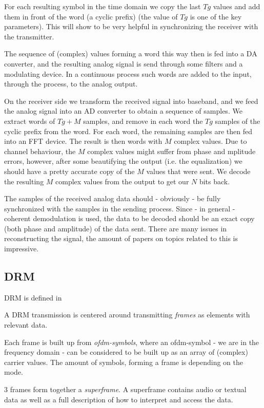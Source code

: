 \documentclass[11pt]{article}
\begin{document}
For each resulting symbol in the time domain we copy the
last $Tg$ values and add them
in front of the word (a cyclic prefix) (the value of $Tg$ is one of the
key parameters). This will show to be very helpful
in synchronizing the receiver with the transmitter.

The sequence of (complex) values forming a word this way then is fed into
a DA converter, and the resulting analog signal is
send through some filters and a modulating device.
In a continuous process such words are added
to the input, through the process, to the analog output.

On the receiver side  we transform the received signal into baseband,
and we feed the analog signal into an AD converter to obtain
a sequence of samples.
We extract words of $Tg + M$ samples, and remove in each word
the $Tg$ samples of the
cyclic prefix from the word.
For each word, the remaining samples are then fed into an FFT device.
The result is then words with $M$ complex values.
Due to channel behaviour, the $M$ complex values might suffer from
phase and mplitude errors, however,
after some beautifying
the output (i.e. the equalization) we should have a pretty accurate copy
of the $M$ values that were sent.
We decode
the resulting $M$ complex values from the output to get our $N$ bits back.

The samples of the received analog data should - obviously -
be fully synchronized with the samples in the sending process.
Since - in general - coherent demodulation is used, the data to be
decoded should be an exact copy (both phase and amplitude) of the
data sent. There are many issues in reconstructing the signal, the amount
of papers on topics related to this is impressive.
\subsection{DRM}
DRM is defined in \cite{drm-definition}

A DRM transmission is centered around transmitting
{\em frames} as elements with relevant data.

Each frame is built up from {\em ofdm-symbols},
where an ofdm-symbol - we are in the
frequency domain - can be considered to be built up as an array
 of (complex) carrier values.
The amount of symbols, forming a frame is depending on the mode.

3 frames form together a {\em superframe}. A superframe
contains audio or textual data as well as a full description of how
to interpret and access the data.
\end{document}
